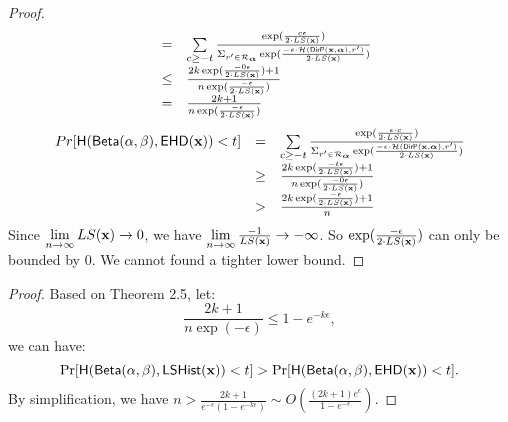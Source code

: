 \documentclass{article}
\begin{document}
\begin{proof}
\[\begin{array}{lcl}
	& =  & \sum\limits_{c \geq - t}
	\frac
  	{\exp(\frac{c\epsilon}{2\cdot LS(\textbf{x})})}
	{\Sigma_{r' \in \mathcal{R}_{\boldsymbol{\alpha}}}\exp(\frac{-\epsilon\cdot \mathcal{H}(\mathsf{DirP}(\textbf{x},\boldsymbol{\alpha}), r')}{2\cdot LS(\textbf{x})})}\\
 	& \leq &
 	\frac
  	{2k\exp(\frac{-0\epsilon }{2\cdot LS(\textbf{x})}) + 1}
	{n\exp(\frac{-\epsilon }{2\cdot LS(\textbf{x})})}\\
 	& = &
 	\frac
  	{2k + 1}
	{n\exp(\frac{-\epsilon }{2\cdot LS(\textbf{x})})}
\end{array}
\]
\[
	\begin{array}{lcl}
	Pr[\mathsf{H}(\mathsf{Beta}(\alpha, \beta), \mathsf{EHD}(\textbf{x})) < t] 
	& =  & \sum\limits_{c \geq - t}
	\frac
  {\exp(\frac{\epsilon\cdot c}{2\cdot LS(\textbf{x})})}
{\Sigma_{r' \in \mathcal{R}_{\boldsymbol{\alpha}}}\exp(\frac{-\epsilon\cdot \mathcal{H}(\mathsf{DirP}(\textbf{x},\boldsymbol{\alpha}), r')}{2\cdot LS(\textbf{x})})}\\
 	& \geq &
 	\frac
  	{2k\exp(\frac{-t\epsilon }{2\cdot LS(\textbf{x})}) + 1}
	{n\exp(\frac{-0\epsilon }{2\cdot LS(\textbf{x})})}\\
 	& > &
 	\frac
  	{2k\exp(\frac{-\epsilon }{2\cdot LS(\textbf{x})}) + 1}
	{n}
\end{array}
\]
Since $\lim\limits_{n \rightarrow \infty} LS(\textbf{x}) \rightarrow 0$, 
we have $\lim\limits_{n \rightarrow \infty}\frac{-1}{LS(\textbf{x})} \rightarrow -\infty$. So $\exp(\frac{-\epsilon }{2\cdot LS(\textbf{x})})$ can only be bounded by $0$. We cannot found a tighter lower bound.
%
\end{proof}
%
%
\begin{proof}
Based on Theorem 2.5, let:
\[
	\frac
  	{2k+1}
	{n\exp(-\epsilon)} \leq 1 - e^{-k\epsilon},
\]
we can have:
\[
	\Pr[\mathsf{H}(\mathsf{Beta}(\alpha, \beta), \mathsf{LSHist}(\textbf{x}))< t]
	> 
	\Pr[\mathsf{H}(\mathsf{Beta}(\alpha, \beta), \mathsf{EHD}(\textbf{x}))< t].
\]
By simplification, we have $n > \frac{2k + 1}{e^{-\epsilon}(1 - e^{-k\epsilon})} \sim O(\frac{(2k + 1 )e^{\epsilon}}{1 - e^{-\epsilon}})$.
\end{proof}
\end{document}
